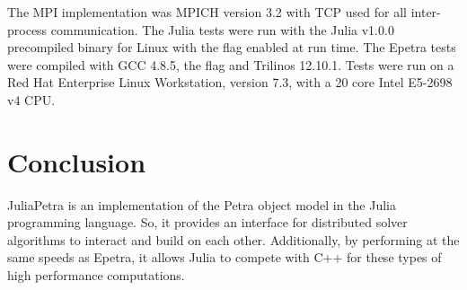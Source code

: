 \documentclass[acmsmall]{acmart}
\newcommand{\snippet}[1]{\texttt{\detokenize{#1}}}
\begin{document}
The MPI implementation was MPICH version 3.2 with TCP used for all inter-process communication.
The Julia tests were run with the Julia v1.0.0 precompiled binary for Linux with the \snippet{-O3} flag enabled at run time.
The Epetra tests were compiled with GCC 4.8.5, the \snippet{-O3} flag and Trilinos 12.10.1.
Tests were run on a Red Hat Enterprise Linux Workstation, version 7.3,
with a 20 core Intel E5-2698 v4 CPU.

\section{Conclusion}

JuliaPetra is an implementation of the Petra object model in the Julia programming language.
So, it provides an interface for distributed solver algorithms to interact and build on each other.
Additionally, by performing at the same speeds as Epetra,
it allows Julia to compete with C++ for these types of high performance computations.



\end{document}
